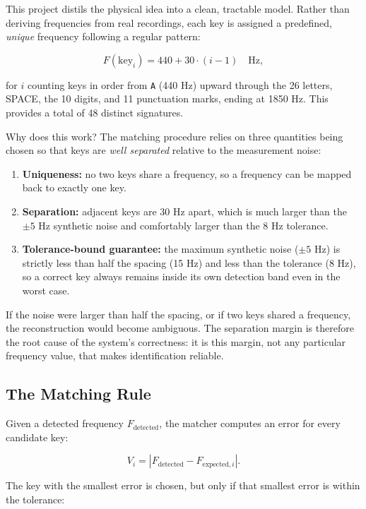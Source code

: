\documentclass[11pt,a4paper]{article}
\newcommand{\Key}[1]{\texttt{#1}}
\begin{document}
This project distils the physical idea into a clean, tractable model. Rather
than deriving frequencies from real recordings, each key is assigned a
predefined, \emph{unique} frequency following a regular pattern:

\[
F(\text{key}_i) = 440 + 30 \cdot (i - 1) \quad \text{Hz},
\]

for $i$ counting keys in order from \Key{A} (440 Hz) upward through the 26
letters, SPACE, the 10 digits, and 11 punctuation marks, ending at 1850 Hz.
This provides a total of 48 distinct signatures.

Why does this work? The matching procedure relies on three quantities being
chosen so that keys are \emph{well separated} relative to the measurement
noise:

\begin{enumerate}
    \item \textbf{Uniqueness:} no two keys share a frequency, so a frequency
          can be mapped back to exactly one key.
    \item \textbf{Separation:} adjacent keys are 30 Hz apart, which is much
          larger than the $\pm 5$ Hz synthetic noise and comfortably larger
          than the 8 Hz tolerance.
    \item \textbf{Tolerance-bound guarantee:} the maximum synthetic noise
          ($\pm 5$ Hz) is strictly less than half the spacing (15 Hz) and less
          than the tolerance (8 Hz), so a correct key always remains inside
          its own detection band even in the worst case.
\end{enumerate}

If the noise were larger than half the spacing, or if two keys shared a
frequency, the reconstruction would become ambiguous. The separation margin is
therefore the root cause of the system's correctness: it is this margin, not
any particular frequency value, that makes identification reliable.

\subsection{The Matching Rule}

Given a detected frequency $F_{\text{detected}}$, the matcher computes an error
for every candidate key:

\[
V_i = |F_{\text{detected}} - F_{\text{expected},i}|.
\]

The key with the smallest error is chosen, but only if that smallest error is
within the tolerance:
\end{document}
